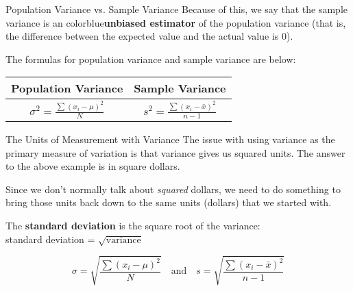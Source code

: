 \documentclass[t]{beamer}
\begin{document}
\begin{frame}{Population Variance vs. Sample Variance}
Because of this, we say that the sample variance is an {color{blue}\textbf{unbiased estimator}} of the population variance (that is, the difference between the expected value and the actual value is 0).	\newline\\	\pause

The formulas for population variance and sample variance are below:	\newline\\

\begin{center}
\setlength{\extrarowheight}{7pt}
\begin{tabular}{c|c}
\textbf{Population Variance} & \textbf{Sample Variance} \\ \hline
$\sigma^2 = \frac{\sum (x_i-\mu)^2}{N}$	&	$s^2 = \frac{\sum (x_i-\bar{x})^2}{n-1}$
\end{tabular}
\end{center}
\end{frame}

\begin{frame}{The Units of Measurement with Variance}
The issue with using variance as the primary measure of variation is that variance gives us squared units. The answer to the above example is in square dollars.	\newline\\	\pause

Since we don't normally talk about \emph{squared} dollars, we need to do something to bring those units back down to the same units (dollars) that we started with.	\newline\\	\pause

The {\color{blue}\textbf{standard deviation}} is the square root of the variance: \newline\\ standard deviation = $\sqrt{\text{variance}}$

\[\sigma = \sqrt{\frac{\sum (x_i-\mu)^2}{N}} \quad \text{and} \quad s = \sqrt{\frac{\sum (x_i-\bar{x})^2}{n-1}}\]
\end{frame}
\end{document}
